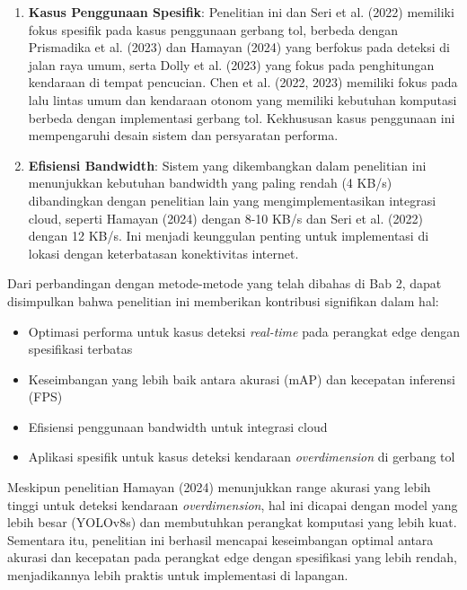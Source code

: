 \begin{enumerate}[nolistsep]
    \item \textbf{Kasus Penggunaan Spesifik}: Penelitian ini dan Seri et al. (2022) memiliki fokus spesifik pada kasus penggunaan gerbang tol, berbeda dengan Prismadika et al. (2023) dan Hamayan (2024) yang berfokus pada deteksi di jalan raya umum, serta Dolly et al. (2023) yang fokus pada penghitungan kendaraan di tempat pencucian. Chen et al. (2022, 2023) memiliki fokus pada lalu lintas umum dan kendaraan otonom yang memiliki kebutuhan komputasi berbeda dengan implementasi gerbang tol. Kekhususan kasus penggunaan ini mempengaruhi desain sistem dan persyaratan performa.
    \item \textbf{Efisiensi Bandwidth}: Sistem yang dikembangkan dalam penelitian ini menunjukkan kebutuhan bandwidth yang paling rendah (4 KB/s) dibandingkan dengan penelitian lain yang mengimplementasikan integrasi cloud, seperti Hamayan (2024) dengan 8-10 KB/s dan Seri et al. (2022) dengan 12 KB/s. Ini menjadi keunggulan penting untuk implementasi di lokasi dengan keterbatasan konektivitas internet.
\end{enumerate}

Dari perbandingan dengan metode-metode yang telah dibahas di Bab 2, dapat disimpulkan bahwa penelitian ini memberikan kontribusi signifikan dalam hal:

\begin{itemize}[nolistsep]
    \item Optimasi performa untuk kasus deteksi \emph{real-time} pada perangkat edge dengan spesifikasi terbatas
    \item Keseimbangan yang lebih baik antara akurasi (mAP) dan kecepatan inferensi (FPS)
    \item Efisiensi penggunaan bandwidth untuk integrasi cloud
    \item Aplikasi spesifik untuk kasus deteksi kendaraan \emph{overdimension} di gerbang tol
\end{itemize}

Meskipun penelitian Hamayan (2024) menunjukkan range akurasi yang lebih tinggi untuk deteksi kendaraan \emph{overdimension}, hal ini dicapai dengan model yang lebih besar (YOLOv8s) dan membutuhkan perangkat komputasi yang lebih kuat. Sementara itu, penelitian ini berhasil mencapai keseimbangan optimal antara akurasi dan kecepatan pada perangkat edge dengan spesifikasi yang lebih rendah, menjadikannya lebih praktis untuk implementasi di lapangan.